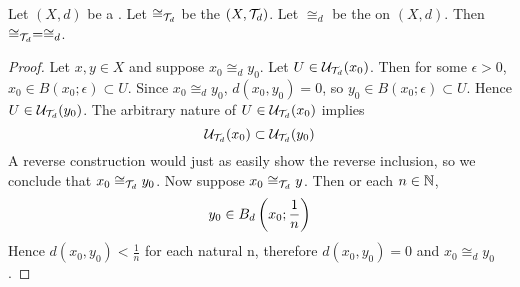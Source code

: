 
\begin{prop}
    \label{prop:relationofzerodistance}
    Let $(X,d)$ be a \PseudometricSpace.
    Let $\cong_{\mathcal{T}_d}$ be the \RelationOfEqualNeighborhoodFilters $(X,\mathcal{T}_d)$. 
    Let $\cong_d$ be the \RelationOfZeroDistance on $(X,d)$. 
    Then $\cong_{\mathcal{T}_d} = \cong_d$. 
    \begin{proof}
        Let $x,y \in X$ and suppose $x_0 \cong_d y_0$.
        Let $U \in \mathcal{U}_{\mathcal{T}_d}(x_0)$. Then for some $\epsilon > 0$, 
        $x_0 \in B(x_0;\epsilon) \subset U$. 
        Since $x_0 \cong_d y_0$, $d(x_0,y_0) = 0$, so $y_0 \in B(x_0 ; \epsilon) \subset U$. 
        Hence $U \in \mathcal{U}_{\mathcal{T}_d}(y_0)$. 
        The arbitrary nature of $U \in \mathcal{U}_{\mathcal{T}_d}(x_0)$ implies 
        \begin{equation}
            \mathcal{U}_{\mathcal{T}_d}(x_0) \subset \mathcal{U}_{\mathcal{T}_d}(y_0)
        \end{equation}
        A reverse construction would just as easily show the reverse inclusion, so we conclude that $x_0 \cong_{\mathcal{T}_d} y_0$. 
        Now suppose $x_0 \cong_{\mathcal{T}_d} y $. Then or each $n \in \mathbb{N}$, 
        \begin{equation}
            y_0 \in B_{d} \left( x_0 ; \frac{1}{n}\right)
        \end{equation}
        Hence $d(x_0, y_0) < \frac{1}{n}$ for each natural n, therefore $d(x_0,y_0) = 0$ and $x_0 \cong_d y_0$. 
    \end{proof}
\end{prop}